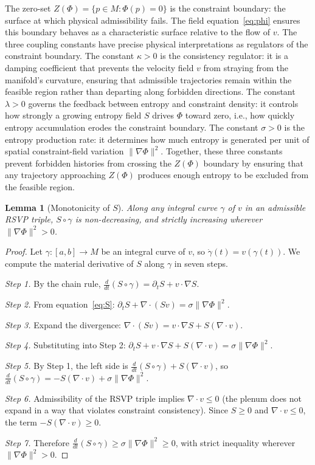 \documentclass[11pt]{article}
\theoremstyle{plain}
\newtheorem{lemma}[theorem]{Lemma}
\theoremstyle{definition}
\theoremstyle{remark}
\newcommand{\Phif}{\Phi}
\newcommand{\vf}{v}
\newcommand{\Sf}{S}
\begin{document}
The zero-set $Z(\Phif) = \{p \in M : \Phif(p) = 0\}$ is the constraint boundary: the surface at which physical admissibility fails. The field equation~\eqref{eq:phi} ensures this boundary behaves as a characteristic surface relative to the flow of $\vf$. The three coupling constants have precise physical interpretations as regulators of the constraint boundary. The constant $\kappa > 0$ is the consistency regulator: it is a damping coefficient that prevents the velocity field $\vf$ from straying from the manifold's curvature, ensuring that admissible trajectories remain within the feasible region rather than departing along forbidden directions. The constant $\lambda > 0$ governs the feedback between entropy and constraint density: it controls how strongly a growing entropy field $\Sf$ drives $\Phif$ toward zero, i.e., how quickly entropy accumulation erodes the constraint boundary. The constant $\sigma > 0$ is the entropy production rate: it determines how much entropy is generated per unit of spatial constraint-field variation $\|\nabla\Phif\|^2$. Together, these three constants prevent forbidden histories from crossing the $Z(\Phif)$ boundary by ensuring that any trajectory approaching $Z(\Phif)$ produces enough entropy to be excluded from the feasible region.

\begin{lemma}[Monotonicity of $\Sf$]
\label{lem:S-monotone}
Along any integral curve $\gamma$ of $\vf$ in an admissible RSVP triple, $\Sf \circ \gamma$ is non-decreasing, and strictly increasing wherever $\|\nabla\Phif\|^2 > 0$.
\end{lemma}

\begin{proof}
Let $\gamma: [a,b] \to M$ be an integral curve of $\vf$, so $\dot\gamma(t) = \vf(\gamma(t))$. We compute the material derivative of $\Sf$ along $\gamma$ in seven steps.

\emph{Step 1.} By the chain rule, $\frac{d}{dt}(\Sf \circ \gamma) = \partial_t \Sf + \vf \cdot \nabla \Sf$.

\emph{Step 2.} From equation~\eqref{eq:S}: $\partial_t \Sf + \nabla \cdot (\Sf \vf) = \sigma\|\nabla\Phif\|^2$.

\emph{Step 3.} Expand the divergence: $\nabla \cdot (\Sf \vf) = \vf \cdot \nabla \Sf + \Sf (\nabla \cdot \vf)$.

\emph{Step 4.} Substituting into Step 2: $\partial_t \Sf + \vf \cdot \nabla \Sf + \Sf(\nabla \cdot \vf) = \sigma\|\nabla\Phif\|^2$.

\emph{Step 5.} By Step 1, the left side is $\frac{d}{dt}(\Sf \circ \gamma) + \Sf(\nabla \cdot \vf)$, so $\frac{d}{dt}(\Sf \circ \gamma) = -\Sf(\nabla \cdot \vf) + \sigma\|\nabla\Phif\|^2$.

\emph{Step 6.} Admissibility of the RSVP triple implies $\nabla \cdot \vf \leq 0$ (the plenum does not expand in a way that violates constraint consistency). Since $\Sf \geq 0$ and $\nabla \cdot \vf \leq 0$, the term $-\Sf(\nabla \cdot \vf) \geq 0$.

\emph{Step 7.} Therefore $\frac{d}{dt}(\Sf \circ \gamma) \geq \sigma\|\nabla\Phif\|^2 \geq 0$, with strict inequality wherever $\|\nabla\Phif\|^2 > 0$.
\end{proof}
\end{document}
